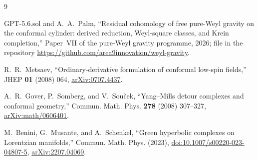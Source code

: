 \documentclass[11pt]{article}
\theoremstyle{definition}
\theoremstyle{remark}
\begin{document}
\begin{thebibliography}{9}

GPT-5.6.sol and A.~A.~Palm,
``Residual cohomology of free pure-Weyl gravity on the conformal cylinder:
derived reduction, Weyl-square classes, and Krein completion,''
Paper~VII of the pure-Weyl gravity programme, 2026;
file  in the
repository \url{https://github.com/area9innovation/weyl-gravity}.

R.~R.~Metsaev,
``Ordinary-derivative formulation of conformal low-spin fields,''
JHEP \textbf{01} (2008) 064,
\href{https://arxiv.org/abs/0707.4437}{arXiv:0707.4437}.

A.~R.~Gover, P.~Somberg, and V.~Sou\v{c}ek,
``Yang--Mills detour complexes and conformal geometry,''
Commun. Math. Phys. \textbf{278} (2008) 307--327,
\href{https://arxiv.org/abs/math/0606401}{arXiv:math/0606401}.

M.~Benini, G.~Musante, and A.~Schenkel,
``Green hyperbolic complexes on Lorentzian manifolds,''
Commun. Math. Phys. (2023),
\href{https://doi.org/10.1007/s00220-023-04807-5}{doi:10.1007/s00220-023-04807-5},
\href{https://arxiv.org/abs/2207.04069}{arXiv:2207.04069}.

\end{thebibliography}
\end{document}
